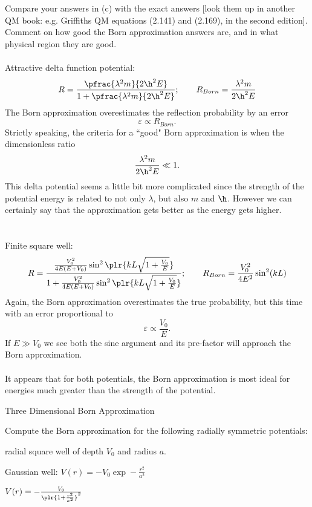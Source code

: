 \documentclass[10pt,letterpaper]{article}
\begin{document}
	\item
	Compare your answers in (c) with the exact answers [look them up in another QM book: e.g. Griffiths
	QM equations (2.141) and (2.169), in the second edition]. Comment on how good the Born approximation
	answers are, and in what physical region they are good.
	\\
	\\
	Attractive delta function potential:
	\[
		R = \frac{ \pfrac{\lambda^2m}{2\h^2 E}}{1+ \pfrac{\lambda^2m}{2\h^2 E}};
		\qquad R_{Born} = \frac{\lambda^2m}{2\h^2 E}
	\]
	The Born approximation overestimates the reflection probability by an error 
	\[
		\varepsilon \propto  R_{Born}.
	\]
	Strictly speaking, the criteria for a ``good" Born approximation is when the dimensionless ratio 
	\[
		\frac{\lambda^2m}{2\h^2 E}\ll 1.
	\]This delta potential 
	seems a little bit more complicated since the strength of the potential energy is related to not only $\lambda$,
	but also $m$ and $\h$. However we can certainly say that the approximation gets better as the energy gets 	
	higher.
	\\
	\\
	\\
	Finite square well: 
	\[
		R = \frac{\frac{V_0^2}{4E(E+V_0)}\sin^2\plr{kL\sqrt{1+\frac{V_0}{E}}}}{1
		+\frac{V_0^2}{4E(E+V_0)}\sin^2\plr{kL\sqrt{1+\frac{V_0}{E}}}};
		\qquad R_{Born} =  \frac{V_0^2}{4E^2}\sin^2(kL)
	\]
	Again, the Born approximation overestimates the true probability, but this time with an error proportional to
	\[
		\varepsilon \propto \frac{V_0}{E}. 
	\]
	If $E\gg V_0$ we see both the sine argument and its pre-factor will approach the Born approximation. 
	\\
	\\
	It appears that for both potentials, the Born approximation is most ideal for energies much greater than the 
	strength of the potential. 
	\eenum
	
	
\item{Three Dimensional Born Approximation}
\\
	\benum
	\item 
	Compute the Born approximation for the following radially symmetric potentials:
		\benum
		\item 
		radial square well of depth $V_0$ and radius $a$.
		\item 
		Gaussian well: $V(r) = -V_0\exp-\frac{r^2}{a^2}$
		\item 
		$V(r) = -\frac{V_0}{\plr{1+\frac{r^2}{a^2}}^2}$
		\\
		\eenum
		
\end{document}
